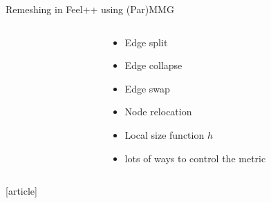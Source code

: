 \documentclass{beamer}
\begin{document}
\begin{frame}{Remeshing in Feel++ using (Par)MMG}
\begin{columns}
\begin{column}{0.5\textwidth}
			\end{column}
			\begin{column}{0.49\textwidth}
				\begin{itemize}
					\item Edge split
					\item Edge collapse
					\item Edge swap
					\item Node relocation
					\item Local size function $h$
					\item lots of ways to control the metric 
				\end{itemize}
			\end{column}
		\end{columns}
		\begin{thebibliography}{9}	[article]
		\end{thebibliography}
	\end{frame}
\end{document}
